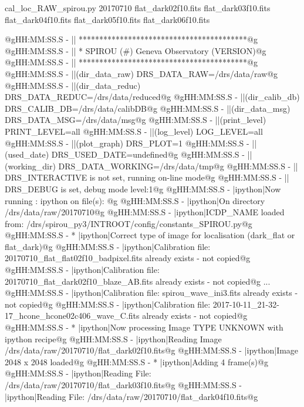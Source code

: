 \begin{cmdbox}[title={example}]
cal_loc_RAW_spirou.py 20170710 flat_dark02f10.fits flat_dark03f10.fits flat_dark04f10.fits flat_dark05f10.fits flat_dark06f10.fits
\end{cmdbox}
\begin{cmdboxprintspecial}[fontupper=\tiny, fontlower=\tiny]
@gHH:MM:SS.S -   || *****************************************@g
@gHH:MM:SS.S -   || * SPIROU \@(#) Geneva Observatory (VERSION)@g
@gHH:MM:SS.S -   || *****************************************@g
@gHH:MM:SS.S -   ||(dir_data_raw)      DRS_DATA_RAW=/drs/data/raw@g
@gHH:MM:SS.S -   ||(dir_data_reduc)    DRS_DATA_REDUC=/drs/data/reduced@g
@gHH:MM:SS.S -   ||(dir_calib_db)      DRS_CALIB_DB=/drs/data/calibDB@g
@gHH:MM:SS.S -   ||(dir_data_msg)      DRS_DATA_MSG=/drs/data/msg@g
@gHH:MM:SS.S -   ||(print_level)       PRINT_LEVEL=all         %
@gHH:MM:SS.S -   ||(log_level)         LOG_LEVEL=all         %
@gHH:MM:SS.S -   ||(plot_graph)        DRS_PLOT=1            %
@gHH:MM:SS.S -   ||(used_date)         DRS_USED_DATE=undefined@g
@gHH:MM:SS.S -   ||(working_dir)       DRS_DATA_WORKING=/drs/data/tmp@g
@gHH:MM:SS.S -   ||                    DRS_INTERACTIVE is not set, running on-line mode@g
@gHH:MM:SS.S -   ||                    DRS_DEBUG is set, debug mode level:1@g
@gHH:MM:SS.S -   |ipython|Now running : ipython on file(s): @g
@gHH:MM:SS.S -   |ipython|On directory /drs/data/raw/20170710@g
@gHH:MM:SS.S -   |ipython|ICDP_NAME loaded from: /drs/spirou_py3/INTROOT/config/constants_SPIROU.py@g
@gHH:MM:SS.S - * |ipython|Correct type of image for localisation (dark_flat or flat_dark)@g
@gHH:MM:SS.S -   |ipython|Calibration file: 20170710_flat_flat02f10_badpixel.fits already exists - not copied@g
@gHH:MM:SS.S -   |ipython|Calibration file: 20170710_flat_dark02f10_blaze_AB.fits already exists - not copied@g
...
@gHH:MM:SS.S -   |ipython|Calibration file: spirou_wave_ini3.fits already exists - not copied@g
@gHH:MM:SS.S -   |ipython|Calibration file: 2017-10-11_21-32-17_hcone_hcone02c406_wave_C.fits already exists - not copied@g
@gHH:MM:SS.S - * |ipython|Now processing Image TYPE UNKNOWN with ipython recipe@g
@gHH:MM:SS.S -   |ipython|Reading Image /drs/data/raw/20170710/flat_dark02f10.fits@g
@gHH:MM:SS.S -   |ipython|Image 2048 x 2048 loaded@g
@gHH:MM:SS.S - * |ipython|Adding 4 frame(s)@g
@gHH:MM:SS.S -   |ipython|Reading File: /drs/data/raw/20170710/flat_dark03f10.fits@g
@gHH:MM:SS.S -   |ipython|Reading File: /drs/data/raw/20170710/flat_dark04f10.fits@g

\end{cmdboxprintspecial}
